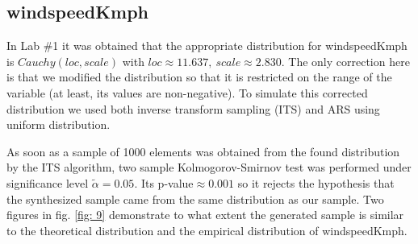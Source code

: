 \documentclass[12pt, bachelor, substylefile = algo_title.rtx]{disser}
\theoremstyle{definition}
\begin{document}
\subsection*{windspeedKmph}
In Lab \#1 it was obtained that the appropriate distribution for windspeedKmph is $Cauchy(loc, scale)$ with $loc \approx 11.637,\ scale \approx 2.830$. The only correction here is that we modified the distribution so that it is restricted on the range of the variable (at least, its values are non-negative). To simulate this corrected distribution we used both inverse transform sampling (ITS) and ARS using uniform distribution.

As soon as a sample of 1000 elements was obtained from the found distribution by the ITS algorithm, two sample Kolmogorov-Smirnov test was performed under significance level $\widetilde{\alpha} = 0.05$. Its p-value$ \approx 0.001$ so it rejects the hypothesis that the synthesized sample came from the same distribution as our sample. Two figures in fig. \ref{fig: 9} demonstrate to what extent the generated sample is similar to the theoretical distribution and the empirical distribution of windspeedKmph.
\end{document}
